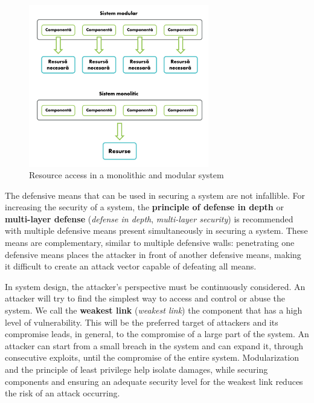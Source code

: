 \begin{figure}[htbp]
  \centering
  \def\svgwidth{\columnwidth}
  \includegraphics[width=0.7\textwidth]{chapters/12-auth/img/modular-vs-monolithic.svg.pdf}
  \caption{Resource access in a monolithic and modular system}
  \label{fig:sec:modular-vs-monolithic}
\end{figure}

The defensive means that can be used in securing a system are not infallible.
For increasing the security of a system, the \textbf{principle of defense in depth} or \textbf{multi-layer defense} (\textit{defense in depth}, \textit{multi-layer security}) is recommended with multiple defensive means present simultaneously in securing a system.
These means are complementary, similar to multiple defensive walls: penetrating one defensive means places the attacker in front of another defensive means, making it difficult to create an attack vector capable of defeating all means.

In system design, the attacker's perspective must be continuously considered.
An attacker will try to find the simplest way to access and control or abuse the system.
We call the \textbf{weakest link} (\textit{weakest link}) the component that has a high level of vulnerability.
This will be the preferred target of attackers and its compromise leads, in general, to the compromise of a large part of the system.
An attacker can start from a small breach in the system and can expand it, through consecutive exploits, until the compromise of the entire system.
Modularization and the principle of least privilege help isolate damages, while securing components and ensuring an adequate security level for the weakest link reduces the risk of an attack occurring.

